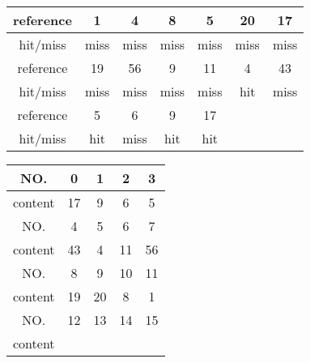 \documentclass[12pt]{article}
\begin{document}
\begin{CJK*}{UTF8}{gbsn}
\begin{enumerate}[a)]
\begin{tabular}{|c|c|c|c|c|c|c|}
\hline 
reference	& 1 		& 4 		& 8 		&5& 20 	& 17 	 \\ 
\hline 
hit/miss		& miss 	& miss 	& miss 	&miss& miss 	& miss 	 \\ 
\hline 
reference &19& 56 & 9 & 11 & 4 & 43  \\ 
\hline 
hit/miss &miss& miss & miss & miss & hit & miss  \\ 
\hline
reference &5& 6 & 9 & 17 &&\\
\hline
hit/miss &hit& miss & hit &hit&&\\
\hline 
\end{tabular} 

\begin{tabular}{|c|c|c|c|c|}
\hline
NO. & 0 & 1 & 2 & 3 \\ 
\hline
content & 17 & 9 & 6 & 5 \\
\hline
NO. & 4 & 5 & 6 & 7\\
\hline
content & 43 & 4 & 11 & 56\\
\hline
NO. & 8 & 9 & 10 & 11\\
\hline
content & 19 & 20 & 8 & 1\\
\hline
NO. & 12&13&14&15\\
\hline
content &&&&\\
\hline
\end{tabular}

\end{enumerate}

\end{CJK*}
\end{document}
